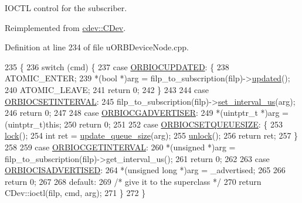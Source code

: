 I\+O\+C\+TL control for the subscriber. 

Reimplemented from \hyperlink{classcdev_1_1CDev_a87eb4d4b92a501de458736e8d24eec40}{cdev\+::\+C\+Dev}.



Definition at line 234 of file u\+O\+R\+B\+Device\+Node.\+cpp.


\begin{DoxyCode}
235 \{
236     \textcolor{keywordflow}{switch} (cmd) \{
237     \textcolor{keywordflow}{case} \hyperlink{drv__orb__dev_8h_a60e19540d21f9a44e9157804121957f8}{ORBIOCUPDATED}: \{
238             ATOMIC\_ENTER;
239             *(\textcolor{keywordtype}{bool} *)arg = filp\_to\_subscription(filp)->\hyperlink{classuORB_1_1SubscriptionInterval_aa1c12b83d65604e306b919a2c224e32e}{updated}();
240             ATOMIC\_LEAVE;
241             \textcolor{keywordflow}{return} 0;
242         \}
243 
244     \textcolor{keywordflow}{case} \hyperlink{drv__orb__dev_8h_a815da46533c3937c84c1496218659d0b}{ORBIOCSETINTERVAL}:
245         filp\_to\_subscription(filp)->\hyperlink{classuORB_1_1SubscriptionInterval_a53018b44bb431a80d47ac95327990b2a}{set\_interval\_us}(arg);
246         \textcolor{keywordflow}{return} 0;
247 
248     \textcolor{keywordflow}{case} \hyperlink{drv__orb__dev_8h_a0ba7c1d8b06e6930ed9589dbebbc775a}{ORBIOCGADVERTISER}:
249         *(uintptr\_t *)arg = (uintptr\_t)\textcolor{keyword}{this};
250         \textcolor{keywordflow}{return} 0;
251 
252     \textcolor{keywordflow}{case} \hyperlink{drv__orb__dev_8h_a4835f9286d5aac7a6b5e0a01661cbee7}{ORBIOCSETQUEUESIZE}: \{
253             \hyperlink{classcdev_1_1CDev_ae676cccee31dd393ab681414a146d868}{lock}();
254             \textcolor{keywordtype}{int} ret = \hyperlink{classuORB_1_1DeviceNode_aa4a59b86caeebbdf513dd60fcee1f5ba}{update\_queue\_size}(arg);
255             \hyperlink{classcdev_1_1CDev_af65273e0578b277deea057dc7d558e9d}{unlock}();
256             \textcolor{keywordflow}{return} ret;
257         \}
258 
259     \textcolor{keywordflow}{case} \hyperlink{drv__orb__dev_8h_acdbdb0d6f9b8600498ffa2599dca742d}{ORBIOCGETINTERVAL}:
260         *(\textcolor{keywordtype}{unsigned} *)arg = filp\_to\_subscription(filp)->get\_interval\_us();
261         \textcolor{keywordflow}{return} 0;
262 
263     \textcolor{keywordflow}{case} \hyperlink{drv__orb__dev_8h_a00f4a4fca062412c74b581a041c43c7a}{ORBIOCISADVERTISED}:
264         *(\textcolor{keywordtype}{unsigned} \textcolor{keywordtype}{long} *)arg = \_advertised;
265 
266         \textcolor{keywordflow}{return} 0;
267 
268     \textcolor{keywordflow}{default}:
269         \textcolor{comment}{/* give it to the superclass */}
270         \textcolor{keywordflow}{return} CDev::ioctl(filp, cmd, arg);
271     \}
272 \}
\end{DoxyCode}
\mbox{\label{classuORB_1_1DeviceNode_a16d1880bc99853428a8d8a240f24857b}} 
